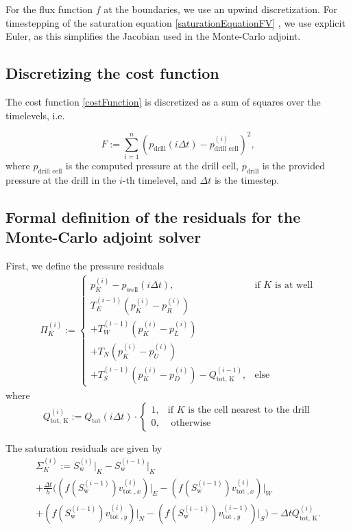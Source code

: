 \documentclass[twoside]{IEEEtran}
\begin{document}
For the flux function $f$ at the boundaries, we use an upwind discretization.
For timestepping of the saturation equation \eqref{saturationEquationFV} , we use explicit Euler, as this simplifies the Jacobian used in the Monte-Carlo adjoint.

\subsection{Discretizing the cost function}
The cost function \eqref{costFunction} is discretized as a sum of squares over the timelevels, i.e.

\begin{equation}
F := \sum_{i=1}^{n} (p_\text{drill}(i\Delta t) - p_\text{drill cell}^{(i)})^2,
\end{equation}
where $p_\text{drill cell}$ is the computed pressure at the drill cell, $p_\text{drill}$ is the provided pressure at the drill in the $i$-th timelevel, and $\Delta t$ is the timestep.

\subsection{Formal definition of the residuals for the Monte-Carlo adjoint solver}
First, we define the pressure residuals
\begin{multline}
\Pi_K^{(i)} := \begin{cases} p_K^{(i)} - p_\text{well}(i\Delta t), & \text{if } K \text{ is at well}\\T_E^{(i-1)} (p_K^{(i)} - p_R^{(i)}) \\+ T_W^{(i-1)} (p_K^{(i)} - p_L^{(i)}) \\+ T_N ( p_K^{(i)} - p_U^{(i)}) \\+ T_S^{(i-1)} (p_K^{(i)} - p_D^{(i)}) - Q_\text{tot, K}^{(i-1)}, & \text{else}\end{cases}
\end{multline}
where
\begin{equation}
Q_\text{tot, K}^{(i)} := Q_\text{tot}(i\Delta t) \cdot \begin{cases} 1, &\text{if } K \text{ is the cell nearest to the drill}\\0, &\text{ otherwise} \end{cases}
\end{equation}

The saturation residuals are given by
\begin{multline}
\Sigma_K^{(i)} := S_\text{w}^{(i)}\lvert_K - S_\text{w}^{(i-1)}\lvert_{K} \\+ \frac{\Delta t}{h} \biggr((f(S_\text{w}^{(i-1)})v_{\text{tot }, x}^{(i)})\lvert_E - (f(S_\text{w}^{(i-1)})v_{\text{tot }, x}^{(i)})\lvert_W \\+ (f(S_\text{w}^{(i-1)})v_{\text{tot }, y}^{(i)})\lvert_N - (f(S_\text{w}^{(i-1)})v_{\text{tot }, y}^{(i-1)})\lvert_S\biggr) - \Delta t Q_\text{tot, K}^{(i)}.
\end{multline}
\end{document}
